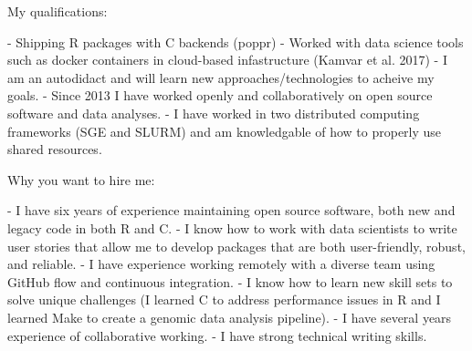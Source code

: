\vspace{1ex}








My qualifications: 

 - Shipping R packages with C backends (poppr)
 - Worked with data science tools such as docker containers in cloud-based infastructure (Kamvar et al. 2017)
 - I am an autodidact and will learn new approaches/technologies to acheive my goals.
 - Since 2013 I have worked openly and collaboratively on open source software and data analyses. 
 - I have worked in two distributed computing frameworks (SGE and SLURM) and am knowledgable of how to properly use shared resources.





Why you want to hire me:

 - I have six years of experience maintaining open source software, both new and
   legacy code in both R and C.
 - I know how to work with data scientists to write user stories that allow me
   to develop packages that are both user-friendly, robust, and reliable.
 - I have experience working remotely with a diverse team using GitHub flow and 
   continuous integration.
 - I know how to learn new skill sets to solve unique challenges (I learned C
   to address performance issues in R and I learned Make to create a genomic
   data analysis pipeline).
 - I have several years experience of collaborative working.
 - I have strong technical writing skills.


